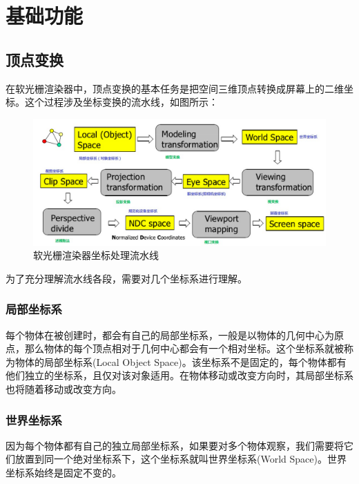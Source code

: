 

    \chapter{基础功能}

    \section{顶点变换}
    \begin{spacing}{2.5}
    在软光栅渲染器中，顶点变换的基本任务是把空间三维顶点转换成屏幕上的二维坐标。这个过程涉及坐标变换的流水线，如图所示：\\
    \begin{figure}[H]
		\centering
		\includegraphics[width=1.0\textwidth]{images/pipline.png}
		\caption{软光栅渲染器坐标处理流水线}
		\label{line}
	\end{figure}
    \end{spacing}

    为了充分理解流水线各段，需要对几个坐标系进行理解。
    \subsection{局部坐标系}
    \begin{spacing}{2.5}
    每个物体在被创建时，都会有自己的局部坐标系，一般是以物体的几何中心为原点，那么物体的每个顶点相对于几何中心都会有一个相对坐标。这个坐标系就被称为物体的局部坐标系(Local Object Space)。该坐标系不是固定的，每个物体都有他们独立的坐标系，且仅对该对象适用。在物体移动或改变方向时，其局部坐标系也将随着移动或改变方向。
    \end{spacing}
    
    \subsection{世界坐标系}
    \begin{spacing}{2.5}
    因为每个物体都有自己的独立局部坐标系，如果要对多个物体观察，我们需要将它们放置到同一个绝对坐标系下，这个坐标系就叫世界坐标系(World Space)。世界坐标系始终是固定不变的。
    \end{spacing}
    
